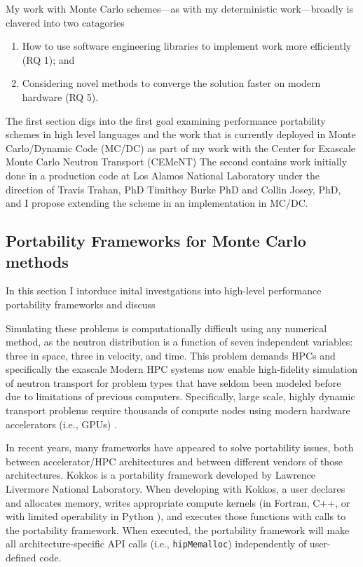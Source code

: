 My work with Monte Carlo schemes---as with my deterministic work---broadly is clavered into two catagories
\begin{enumerate}
    \item How to use software engineering libraries to implement work more efficiently (RQ 1); and
    \item Considering novel methods to converge the solution faster on modern hardware (RQ 5).
\end{enumerate}
The first section digs into the first goal examining performance portability schemes in high level languages and the work that is currently deployed in Monte Carlo/Dynamic Code (MC/DC) as part of my work with the Center for Exascale Monte Carlo Neutron Transport (CEMeNT) 
The second contains work initially done in a production code at Los Alamos National Laboratory under the direction of Travis Trahan, PhD Timithoy Burke PhD and Collin Josey, PhD, and I propose extending the scheme in an implementation in MC/DC.

\subsection{Portability Frameworks for Monte Carlo methods}

In this section I intorduce inital investgations into high-level performance portability frameworks and discuss 

Simulating these problems is computationally difficult using any numerical method, as the neutron distribution is a function of seven independent variables: three in space, three in velocity, and time.
This problem demands HPCs and specifically the exascale
Modern HPC systems now enable high-fidelity simulation of neutron transport for problem types that have seldom been modeled before due to limitations of previous computers. %
Specifically, large scale, highly dynamic transport problems require thousands of compute nodes using modern hardware accelerators (i.e., GPUs) \cite{hamilton_continuous-energy_2019, romano_openmc_nodate}.

In recent years, many frameworks have appeared to solve portability issues, both between accelerator/HPC architectures and between different vendors of those architectures. 
Kokkos \cite{kokkos} is a portability framework developed by Lawrence Livermore National Laboratory.
When developing with Kokkos, a user declares and allocates memory, writes appropriate compute kernels (in Fortran, C++, or with limited operability in Python \cite{AlAwarETAL21PyKokkos}), and executes those functions with calls to the portability framework. 
When executed, the portability framework will make all architecture-specific API calls (i.e., \texttt{hipMemalloc}) independently of user-defined code.

